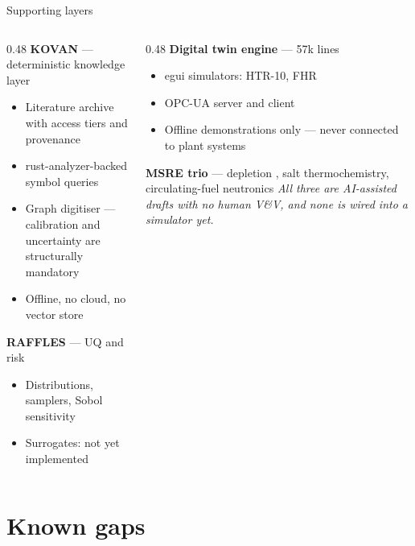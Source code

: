 \documentclass[aspectratio=169,11pt]{beamer}
\newcommand{\caveat}[1]{{\footnotesize\color{opmuted}\textit{#1}}}
\begin{document}
\begin{frame}{Supporting layers}
  \begin{columns}[T]
    \begin{column}{0.48\textwidth}
      \textbf{KOVAN} --- deterministic knowledge layer
      \begin{itemize}
        \item Literature archive with access tiers and provenance
        \item rust-analyzer-backed symbol queries
        \item Graph digitiser --- calibration and uncertainty are structurally mandatory
        \item Offline, no cloud, no vector store
      \end{itemize}
      \vspace{0.5em}
      \textbf{RAFFLES} --- UQ and risk \cite{raven}
      \begin{itemize}
        \item Distributions, samplers, Sobol sensitivity
        \item Surrogates: not yet implemented
      \end{itemize}
    \end{column}
    \begin{column}{0.48\textwidth}
      \textbf{Digital twin engine} --- 57k lines
      \begin{itemize}
        \item egui simulators: HTR-10, FHR
        \item OPC-UA server and client
        \item Offline demonstrations only --- never connected to plant systems
      \end{itemize}
      \vspace{0.5em}
      \textbf{MSRE trio} \cite{msre} --- depletion \cite{thermochimica}, salt
      thermochemistry, circulating-fuel neutronics \cite{moltres}
      \vspace{0.3em}
      \caveat{All three are AI-assisted drafts with no human V\&V, and none is
      wired into a simulator yet.}
    \end{column}
  \end{columns}
\end{frame}

\section{Known gaps}
\end{document}
